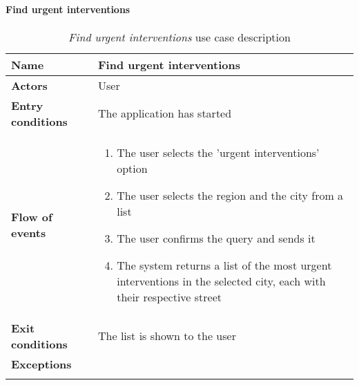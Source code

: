 		\paragraph{Find urgent interventions}
		\begin{longtable}{p{0.25\linewidth}p{0.75\linewidth}}
			\toprule
			\textbf{Name} & \textbf{Find urgent interventions} \\
			\midrule
			\textbf{Actors} & User \\
			\midrule
			\textbf{Entry conditions} & The application has started \\
			\midrule
			\textbf{Flow of events} & 
			\begin{enumerate}
				\item The user selects the 'urgent interventions' option
				\item The user selects the region and the city from a list
				\item The user confirms the query and sends it
				\item The system returns a list of the most urgent interventions in the selected city, each with their respective street
			\end{enumerate} \\
			\midrule
			\textbf{Exit conditions} & The list is shown to the user\\
			\midrule
			\textbf{Exceptions} &  \\
			\bottomrule
			\caption{\emph{Find urgent interventions} use case description}
		\end{longtable}
	
